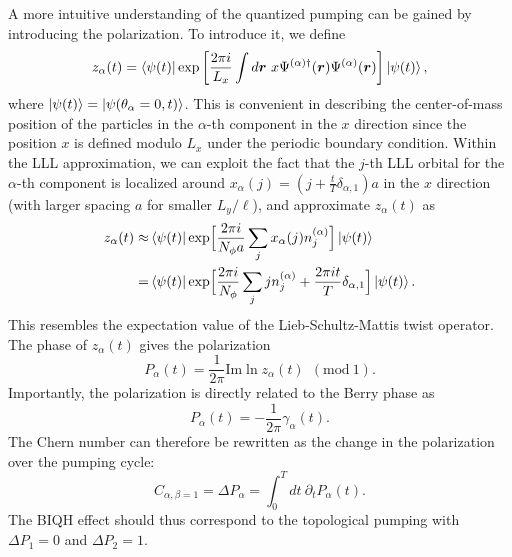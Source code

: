 \documentclass[aps,prb,twocolumn,superscriptaddress,showpacs,floatfix]{revtex4-1}
\begin{document}
A more intuitive understanding of the quantized pumping can be gained by introducing the polarization. 
To introduce it, we define 
\begin{align}
 z_\alpha(t) = \bra{\psi(t)}\exp \left[ \frac{2\pi i}{L_x} \int d\bm{r}~x \Psi^{(\alpha)\dagger}(\bm{r}) \Psi^{(\alpha)}(\bm{r}) \right] \ket{\psi(t)}, 
\end{align}
where $\ket{\psi(t)}=\ket{\psi(\theta_\alpha=0,t)}$. 
This is convenient in describing the center-of-mass position of the particles in the $\alpha$-th component in the $x$ direction
since the position $x$ is defined modulo $L_x$ under the periodic boundary condition. 
Within the LLL approximation, we can exploit the fact that the $j$-th LLL orbital for the $\alpha$-th component is localized around $x_\alpha(j)=(j+\frac{t}{T}\delta_{\alpha, 1})a$ in the $x$ direction (with larger spacing $a$ for smaller $L_y/\ell$), and approximate $z_\alpha(t)$ as
\begin{align}
z_\alpha(t)
\approx &\bra{\psi(t)}\exp\Bigl[\frac{2\pi i}{N_\phi a}\sum_j x_\alpha(j)n^{(\alpha)}_j\Bigr]\ket{\psi(t)}\notag\\
=&\bra{\psi(t)}\exp\Bigl[\frac{2\pi i}{N_\phi}\sum_j jn^{(\alpha)}_j+\frac{2\pi it}{T}\delta_{\alpha,1}\Bigr]\ket{\psi(t)}. \label{z_LLL} 
\end{align}
This resembles the expectation value of the Lieb-Schultz-Mattis twist operator.\cite{LSM, AffleckLieb, OYA, NakamuraTodo, NakamuraVoit, Oshikawa} 
The phase of $z_\alpha(t)$ gives the polarization\cite{Resta2,RestaSorella}
\begin{equation}
 P_\alpha(t)=\frac{1}{2\pi}\mathrm{Im}\ln z_\alpha(t) \ \ (\mathrm{mod}\ 1).
\end{equation}
Importantly, the polarization is directly related to the Berry phase as\cite{Resta1, KingSmith, OrtizMartin, Resta2} 
\begin{equation}
P_\alpha(t)=-\frac{1}{2\pi}\gamma_\alpha(t).
\end{equation}
The Chern number can therefore be rewritten as the change in the polarization over the pumping cycle: 
\begin{equation}
C_{\alpha,\beta=1}=\Delta P_\alpha=\int_0^{T}dt~ \partial_{t}P_\alpha(t).
\label{Chern2}
\end{equation}
The BIQH effect should thus correspond to the topological pumping with $\Delta P_1=0$ and $\Delta P_2=1$. 
\end{document}
